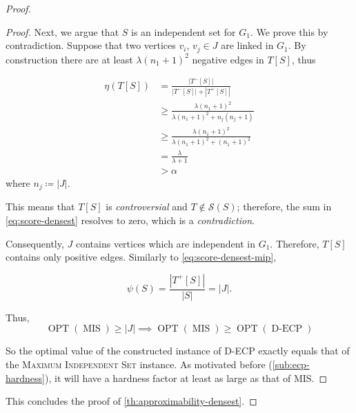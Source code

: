 \begin{proof}
\begin{proof}
		Next, we argue that $S$ is an independent set for $G_1$. We prove this by
		contradiction. Suppose
		that two vertices $v_{i} $, $v_{j} \in J$ are linked in $G_1$.
		By construction there are at least $\lambda (n_1 + 1)^{2} $ negative edges in
		$T[S]$, thus

		\begin{align*}
			\eta(T[S]) & = \frac{|T^{-}[S]|}{|T^{-}[S]| + |T^{+}[S]|}      \\
			           & \geq \frac{\lambda (n_1+1)^2}{\lambda (n_1+1)^2 +
				n_j(n_j+1)}
			\\ & \geq \frac{\lambda (n_1+1)^{2} }{\lambda (n_1+1)^2 + (n_1+1)^2}
			\\ & = \frac{\lambda }{\lambda + 1}
			\\ & > \alpha
		\end{align*}
		where $n_{j} \coloneqq |J|$.


		This means that $T[S]$ is \emph{controversial} and $T \not\in
			\mathcal{S}(S) $; therefore, the sum in \eqref{eq:score-densest} resolves to
		zero, which is a \emph{contradiction}.

		Consequently, $J$ contains vertices which are independent in $G_1$.
		Therefore, $T[S]$ contains only positive edges. Similarly to
		\eqref{eq:score-densest-mip},

		\begin{equation}
			\psi(S) = \frac{|T^{+}[S]|}{|S|} = |J|.
		\end{equation}

		Thus,
		\begin{equation}
			\operatorname{OPT}(\operatorname{MIS}) \geq |J| \implies
			\operatorname{OPT}(\operatorname{MIS}) \geq
			\operatorname{OPT}(\operatorname{D-ECP})
		\end{equation}

		So the optimal value of the constructed instance of \acrshort{D-ECP}
		exactly equals that of the \textsc{Maximum Independent Set} instance.
		As motivated before (\autoref{sub:ecp-hardness}), it will have a hardness factor at least as large as that of MIS.
	\end{proof}

	This concludes the proof of \autoref{th:approximability-densest}.
\end{proof}
